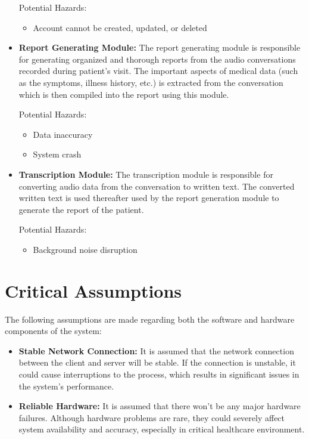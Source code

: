 \documentclass{article}
\begin{document}
\begin{itemize}
    Potential Hazards:
    \begin{itemize}
        \item Account cannot be created, updated, or deleted
    \end{itemize}
    
    \item \textbf{Report Generating Module:}
    The report generating module is responsible for generating organized and thorough reports from the audio conversations recorded during patient's visit. The important aspects of medical data (such as the symptoms, illness history, etc.) is extracted from the conversation which is then compiled into the report using this module.

    Potential Hazards:
    \begin{itemize}
        \item Data inaccuracy
        \item System crash
    \end{itemize}

    \item \textbf{Transcription Module:}
    The transcription module is responsible for converting audio data from the conversation to written text. The converted written text is used thereafter used by the report generation module to generate the report of the patient.

    Potential Hazards:
    \begin{itemize}
        \item Background noise disruption
    \end{itemize}
    
\end{itemize}


\section{Critical Assumptions}

The following assumptions are made regarding both the software and hardware components of the system:

\begin{itemize}
    \item \textbf{Stable Network Connection:} It is assumed that the network connection between the client and server will be stable. If the connection is unstable, it could cause interruptions to the process, which results in significant issues in the system’s performance.
        
    \item \textbf{Reliable Hardware:} It is assumed that there won’t be any major hardware failures. Although hardware problems are rare, they could severely affect system availability and accuracy, especially in critical healthcare environment.
\end{itemize}
\end{document}
